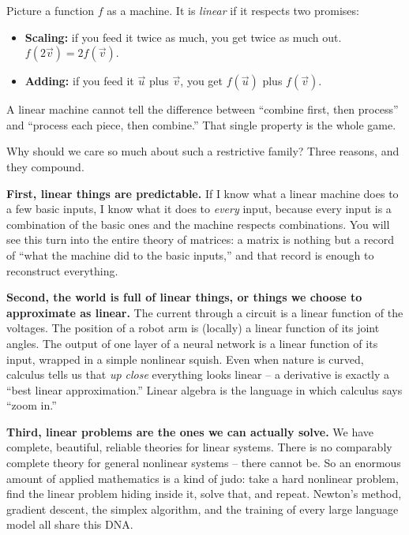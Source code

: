\begin{intuitionbox}
Picture a function $f$ as a machine. It is \emph{linear} if it respects two promises:
\begin{itemize}
  \item \textbf{Scaling:} if you feed it twice as much, you get twice as much out. $f(2\vec v) = 2f(\vec v)$.
  \item \textbf{Adding:} if you feed it $\vec u$ plus $\vec v$, you get $f(\vec u)$ plus $f(\vec v)$.
\end{itemize}
A linear machine cannot tell the difference between ``combine first, then process'' and ``process
each piece, then combine.'' That single property is the whole game.
\end{intuitionbox}

Why should we care so much about such a restrictive family? Three reasons, and they compound.

\textbf{First, linear things are predictable.} If I know what a linear machine does to a few basic
inputs, I know what it does to \emph{every} input, because every input is a combination of the basic
ones and the machine respects combinations. You will see this turn into the entire theory of
matrices: a matrix is nothing but a record of ``what the machine did to the basic inputs,'' and that
record is enough to reconstruct everything.

\textbf{Second, the world is full of linear things, or things we choose to approximate as linear.}
The current through a circuit is a linear function of the voltages. The position of a robot arm is
(locally) a linear function of its joint angles. The output of one layer of a neural network is a
linear function of its input, wrapped in a simple nonlinear squish. Even when nature is curved,
calculus tells us that \emph{up close} everything looks linear -- a derivative is exactly a ``best
linear approximation.'' Linear algebra is the language in which calculus says ``zoom in.''

\textbf{Third, linear problems are the ones we can actually solve.} We have complete, beautiful,
reliable theories for linear systems. There is no comparably complete theory for general nonlinear
systems -- there cannot be. So an enormous amount of applied mathematics is a kind of judo: take a
hard nonlinear problem, find the linear problem hiding inside it, solve that, and repeat. Newton's
method, gradient descent, the simplex algorithm, and the training of every large language model all
share this DNA.

